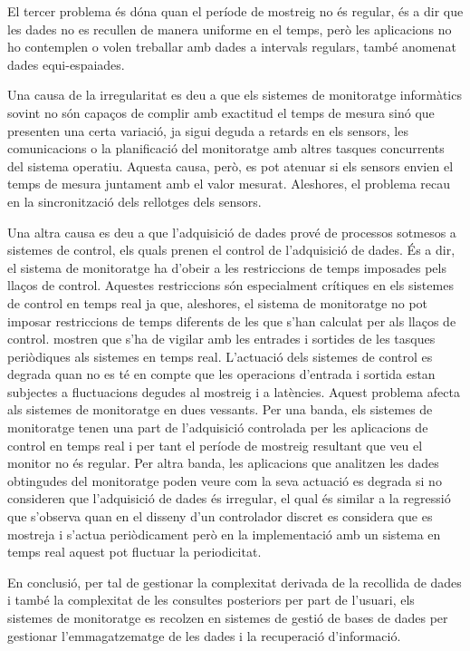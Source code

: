 El tercer problema és dóna quan el període de mostreig no és regular, és a dir que les dades no es recullen de manera uniforme en el temps, però les aplicacions no ho contemplen o volen treballar amb dades a intervals regulars, també anomenat dades equi-espaiades.

Una causa de la irregularitat es deu a que els sistemes de monitoratge informàtics sovint no són capaços de complir amb exactitud el temps de mesura sinó que presenten una certa variació, ja sigui deguda a retards en els sensors, les comunicacions o la planificació del monitoratge amb altres tasques concurrents del sistema operatiu. Aquesta causa, però, es pot atenuar si els sensors envien el temps de mesura juntament amb el valor mesurat. Aleshores, el problema recau en la sincronització dels rellotges dels sensors.

Una altra causa es deu a que l'adquisició de dades prové de processos sotmesos a sistemes de control, els quals prenen el control de l'adquisició de dades. És a dir, el sistema de monitoratge ha d'obeir a les restriccions de temps imposades pels llaços de control. Aquestes restriccions són especialment crítiques en els sistemes de control en temps real ja que, aleshores, el sistema de monitoratge no pot imposar restriccions de temps diferents de les que s'han calculat per als llaços de control.  \textcite{lozoya08} mostren que s'ha de vigilar amb les entrades i sortides de les tasques periòdiques als sistemes en temps real. L'actuació dels sistemes de control es degrada quan no es té en compte que les operacions d'entrada i sortida estan subjectes a fluctuacions degudes al mostreig i a latències. Aquest problema afecta als sistemes de monitoratge en dues vessants.
Per una banda, els sistemes de monitoratge tenen una part de l'adquisició controlada per les aplicacions de control en temps real i per tant el període de mostreig resultant que veu el monitor no és regular. 
Per altra banda, les aplicacions que analitzen les dades obtingudes del monitoratge poden veure com la seva actuació es degrada si no consideren que l'adquisició de dades és irregular, el qual és similar a la regressió que s'observa \parencite{lozoya08} quan en el disseny d'un controlador discret es considera que es mostreja i s'actua periòdicament però en la implementació amb un sistema en temps real aquest pot fluctuar la periodicitat.




En conclusió, per tal de gestionar la complexitat derivada de la recollida de dades i també la complexitat de les consultes posteriors per part de l'usuari, els sistemes de monitoratge es recolzen en sistemes de gestió de bases de dades per gestionar l'emmagatzematge de les dades i la recuperació d'informació.




